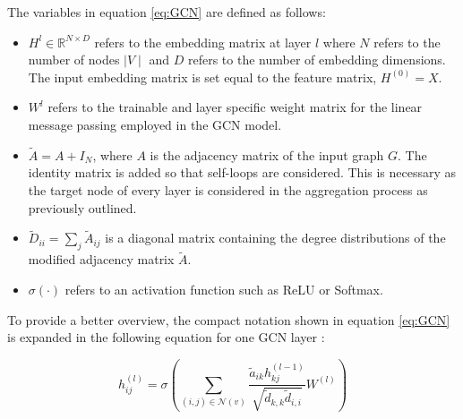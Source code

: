 	\noindent The variables in equation \ref{eq:GCN} are defined as follows:

	\begin{itemize}
		\setlength\itemsep{0.2em}
		\item $H^{l}\in\mathbb{R}^{N \times D}$ refers to the embedding matrix
			at layer $l$ where $N$ refers to the number of nodes $\mid V \mid$
			and $D$ refers to the number of embedding dimensions. The input
			embedding matrix is set equal to the feature matrix, $H^{(0)}=X$.
		\item $W^{l}$ refers to the trainable and layer specific weight matrix
			for the linear message passing employed in the GCN model.
		\item $\tilde A = A + I_N$, where $A$ is the adjacency matrix of the
			input graph $G$. The identity matrix is added so that self-loops
			are considered. This is necessary as the target node of every layer
			is considered in the aggregation process as previously outlined.
		\item $\tilde D_{ii} = \sum_{j}\tilde A_{ij}$ is a diagonal matrix
			containing the degree distributions of the modified adjacency
			matrix $\tilde A$.
		\item $\sigma(\cdot)$ refers to an activation function such as ReLU or
			Softmax.
	\end{itemize}

	\noindent To provide a better overview, the compact notation shown in 
	equation \ref{eq:GCN} is expanded in the following equation for one GCN
	layer \citep{Dubois2019}:

	\begin{equation}
		h_{ij}^{(l)} = \sigma\left(\sum_{(i,j)\in
		\mathcal{N}(v)}\frac{\tilde a_{ik}h_{kj}^{(l-1)}}{\sqrt{\tilde
d_{k,k}\tilde d_{i,i}}} W^{(l)}\right)
		\label{eq:GCN_expand}
	\end{equation}
	
